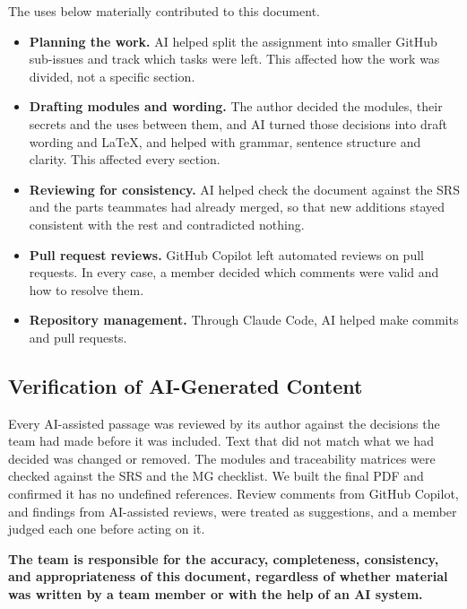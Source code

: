 \documentclass[12pt, titlepage]{article}
\begin{document}
The uses below materially contributed to this document.

\begin{itemize}
  \item \textbf{Planning the work.} AI helped split the assignment into smaller
  GitHub sub-issues and track which tasks were left. This affected how the work
  was divided, not a specific section.

  \item \textbf{Drafting modules and wording.} The author decided the modules,
  their secrets and the uses between them, and AI turned those decisions into
  draft wording and \LaTeX{}, and helped with grammar, sentence structure and
  clarity. This affected every section.

  \item \textbf{Reviewing for consistency.} AI helped check the document
  against the SRS and the parts teammates had already merged, so that new
  additions stayed consistent with the rest and contradicted nothing.

  \item \textbf{Pull request reviews.} GitHub Copilot left automated reviews on
  pull requests. In every case, a member decided which comments were valid and
  how to resolve them.

  \item \textbf{Repository management.} Through Claude Code, AI helped make
  commits and pull requests.
\end{itemize}

\subsection{Verification of AI-Generated Content}

Every AI-assisted passage was reviewed by its author against the decisions the
team had made before it was included. Text that did not match what we had
decided was changed or removed. The modules and traceability matrices were
checked against the SRS and the MG checklist. We built the final PDF and
confirmed it has no undefined references. Review comments from GitHub Copilot,
and findings from AI-assisted reviews, were treated as suggestions, and a
member judged each one before acting on it.

\textbf{The team is responsible for the accuracy, completeness, consistency,
and appropriateness of this document, regardless of whether material was
written by a team member or with the help of an AI system.}
\end{document}

